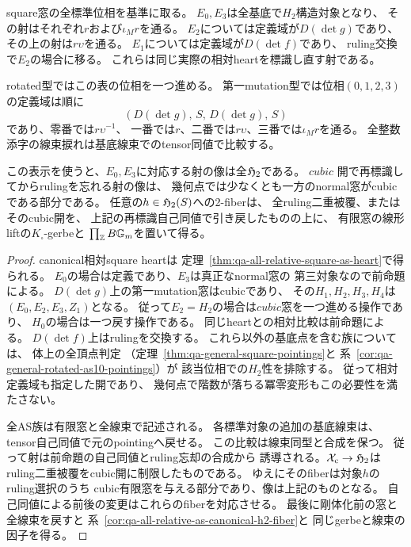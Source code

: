 \begin{theorem}
\label{thm:qa-all-as-relative-h2-pointing-fibers}
square窓の全標準位相を基準に取る。
$E_0,E_3$は全基底で$H_2$構造対象となり、
その射はそれぞれ$r$および$\iota_M r$を通る。
$E_2$については定義域が$D(\det g)$であり、
その上の射は$r\upsilon$を通る。
$E_1$については定義域が$D(\det f)$であり、
ruling交換で$E_2$の場合に移る。
これらは同じ実際の相対heartを標識し直す射である。

rotated型ではこの表の位相を一つ進める。
第一mutation型では位相$(0,1,2,3)$の定義域は順に
\[
 (D(\det g),\,S,\,D(\det g),\,S)
\]
であり、零番では$r\upsilon^{-1}$、
一番では$r$、二番では$r\upsilon$、三番では$\iota_M r$を通る。
全整数添字の線束捩れは基底線束でのtensor同値で比較する。

この表示を使うと、$E_0,E_3$に対応する射の像は全$\mathfrak H_2$である。
$cubic$ 開で再標識してからrulingを忘れる射の像は、
幾何点では少なくとも一方のnormal窓がcubicである部分である。
任意の$h\in\mathfrak H_2(S)$への2-fiberは、
全ruling二重被覆、またはそのcubic開を、
上記の再標識自己同値で引き戻したものの上に、
有限窓の線形liftの$K_\square$-gerbeと
$\prod_{\mathbb Z}B\mathbb G_m$を置いて得る。
\end{theorem}
\begin{proof}
canonical相対square heartは
定理~\ref{thm:qa-all-relative-square-as-heart}で得られる。
$E_0$の場合は定義であり、$E_3$は真正なnormal窓の
第三対象なので前命題による。
$D(\det g)$上の第一mutation窓はcubicであり、
その$H_1,H_2,H_3,H_4$は$(E_0,E_2,E_3,Z_1)$となる。
従って$E_2=H_2$の場合は$cubic$窓を一つ進める操作であり、
$H_0$の場合は一つ戻す操作である。
同じheartとの相対比較は前命題による。
$D(\det f)$上はrulingを交換する。
これら以外の基底点を含む族については、
体上の全頂点判定
（定理~\ref{thm:qa-general-square-pointings}と
系~\ref{cor:qa-general-rotated-as10-pointings}）が
該当位相での$H_2$性を排除する。
従って相対定義域も指定した開であり、
幾何点で階数が落ちる冪零変形もこの必要性を満たさない。

全AS族は有限窓と全線束で記述される。
各標準対象の追加の基底線束は、
tensor自己同値で元のpointingへ戻せる。
この比較は線束同型と合成を保つ。
従って射は前命題の自己同値とruling忘却の合成から
誘導される。$\mathcal X_{\mathrm c}\to\mathfrak H_2$は
ruling二重被覆をcubic開に制限したものである。
ゆえにそのfiberは対象$h$のruling選択のうち
cubic有限窓を与える部分であり、像は上記のものとなる。
自己同値による前後の変更はこれらのfiberを対応させる。
最後に剛体化前の窓と全線束を戻すと
系~\ref{cor:qa-all-relative-as-canonical-h2-fiber}と
同じgerbeと線束の因子を得る。
\end{proof}

